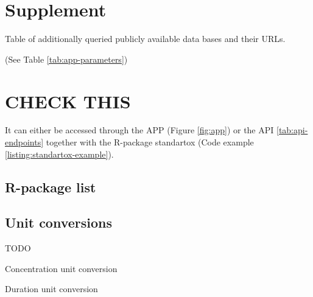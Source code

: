 \section*{Supplement}

\begin{table}
    \label{tab:endpoints-conflate}
    
\end{table}

\begin{table}[ht]
    \label{tab:data-base-additional}
    \caption{Table of additionally queried publicly available data bases and their URLs.}
    
\end{table}

(See Table \ref{tab:app-parameters})


\pagebreak
\section{CHECK THIS}

It can either be accessed through the APP (Figure \ref{fig:app}) or the API \ref{tab:api-endpoints} together with the R-package standartox (Code example \ref{listing:standartox-example}). 


\subsection*{R-package list}
\label{list:r-packages}


\subsection*{Unit conversions}
 TODO
\begin{table}
    \caption{Concentration unit conversion}
    \label{sup:conv-concentration}
\end{table}


\begin{table}
    \caption{Duration unit conversion}
    \label{sup:conv-duration}
\end{table}


%

